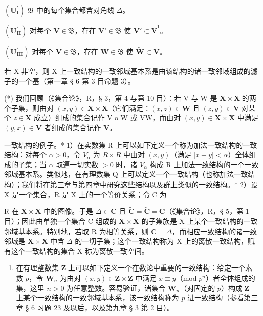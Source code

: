 \((\mathbf{U}_{\mathbf{I}}^{\prime})\) \(\mathfrak{B}\) 中的每个集合都含对角线 \(\Delta\)。

\((\mathbf{U}_{\mathbf{II}}^{\prime})\) 对每个 \(\mathbf{V} \in \mathfrak{B}\)，存在 \(\mathbf{V}' \in \mathfrak{B}\) 使 \(\mathbf{V}' \subset \overline{\mathbf{V}}^1\)。

\((\mathbf{U}_{\mathbf{III}}^{\prime})\) 对每个 \(\mathbf{V} \in \mathfrak{B}\)，存在 \(\mathbf{W} \in \mathfrak{B}\) 使 \(\tilde{\mathbf{W}} \subset \mathbf{V}\)。

若 X 非空，则 X 上一致结构的一致邻域基本系是由该结构的诸一致邻域组成的滤子的一个基（第一章 § 6 第 3 目命题 3）。

(*) 我们回顾（《集合论》，R，§ 3，第 4 与第 10 目）：若 V 与 W 是 \(\mathbf{X} \times \mathbf{X}\) 的两个子集，则由对 \((x, y) \in \mathbf{X} \times \mathbf{X}\)（它们满足：\((x, z) \in \mathbf{W}\) 且 \((z, y) \in \mathbf{V}\) 对某个 \(z \in \mathbf{X}\) 成立）组成的集合记作 V o W 或 VW，而由对 \((x, y) \in \mathbf{X} \times \mathbf{X}\) 中满足 \((y, x) \in \mathbf{V}\) 者组成的集合记作 \(\overline{\mathbf{V}}\)。

一致结构的例子。* 1）在实数集 R 上可以如下定义一个称为加法一致结构的一致结构：对每个 \(\alpha > 0\)，令 \(V_{\alpha}\) 为 \(R \times R\) 中由对 \((x, y)\)（满足 \(|x - y| < \alpha\)）全体组成的子集；当 \(\alpha\) 取遍一切实数 \(> 0\) 时，诸 \(V_{\alpha}\) 构成 R 上加法一致结构的一个一致邻域基本系。类似地，在有理数集 Q 上可以定义一个一致结构（也称加法一致结构）；我们将在第三章与第四章中研究这些结构以及群上类似的一致结构。* 2）设 X 是一个集合，R 是 X 上的一个等价关系；令 C 为

R 在 \(\mathbf{X} \times \mathbf{X}\) 中的图像。于是 \(\Delta \subset \mathbf{C}\) 且 \(\tilde{\mathbf{C}} = \tilde{\mathbf{C}} = \mathbf{C}\)（《集合论》，R，§ 5，第 1 目）；因此由单独一个集合 C 组成的 \(\mathbf{X} \times \mathbf{X}\) 的子集族是 X 上某个一致结构的一致邻域基本系。特别地，若取 R 为相等关系，则 \(\mathbf{C} = \Delta\)，而相应一致结构的诸一致邻域是 \(\mathbf{X} \times \mathbf{X}\) 中含 \(\Delta\) 的一切子集；这个一致结构称为 X 上的离散一致结构，赋有这个一致结构的集合 X 称为离散一致空间。

\begin{enumerate}
\def\labelenumi{\arabic{enumi})}
\setcounter{enumi}{2}
\tightlist
\item
  在有理整数集 \(\mathbf{Z}\) 上可以如下定义一个在数论中重要的一致结构：给定一个素数 \(p\)，令 \(\mathbf{W}_n\) 为由对 \((x,y)\in \mathbf{Z}\times \mathbf{Z}\) 中满足 \(x\equiv y\)（mod \(p^n\)）者全体组成的集，这里 \(n > 0\) 为任意整数。容易验证，诸集合 \(\mathbf{W}_n\)（对固定的 \(p\)）构成 \(\mathbf{Z}\) 上某个一致结构的一致邻域基本系，该一致结构称为 \(p\) 进一致结构（参看第三章 § 6 习题 23 及以后，以及第九章 § 3 第 2 目）。
\end{enumerate}

